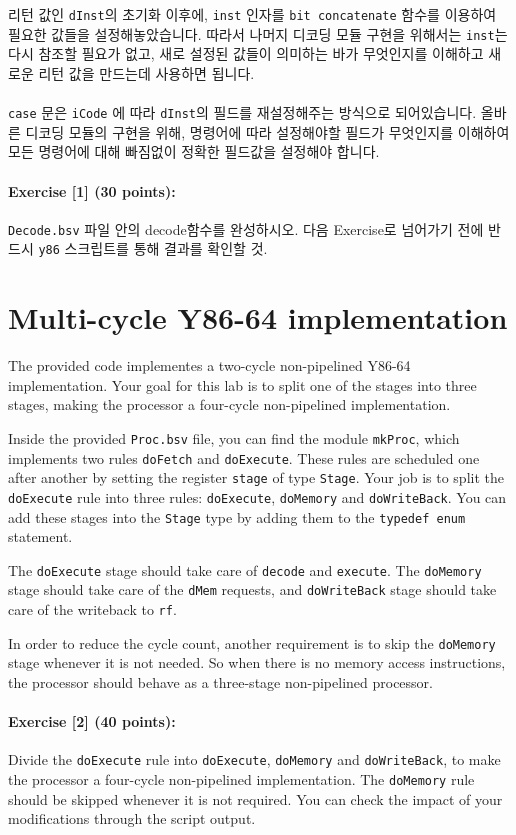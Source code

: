 \documentclass{article}
\begin{document}
  리턴 값인 \texttt{dInst}의 초기화 이후에, \texttt{inst} 인자를 \texttt{bit concatenate}
함수를 이용하여 필요한 값들을 설정해놓았습니다. 따라서 나머지 디코딩 모듈 구현을 위해서는
\texttt{inst}는 다시 참조할 필요가 없고, 새로 설정된 값들이 의미하는 바가 무엇인지를 이해하고 새로운
리턴 값을 만드는데 사용하면 됩니다.
\\\\
  \indent\texttt{case} 문은 \texttt{iCode} 에 따라 \texttt{dInst}의 필드를 재설정해주는 방식으로 되어있습니다.
올바른 디코딩 모듈의 구현을 위해, 명령어에 따라 설정해야할 필드가 무엇인지를 이해하여 모든 명령어에 대해 빠짐없이 정확한 필드값을 설정해야 합니다.

\noindent \paragraph{\bf Exercise [1] (30 points):} \texttt{Decode.bsv} 파일 안의 decode함수를 완성하시오. 다음 Exercise로
넘어가기 전에 반드시 \texttt{y86} 스크립트를 통해 결과를 확인할 것.

\section{Multi-cycle Y86-64 implementation}

The provided code implementes a two-cycle non-pipelined Y86-64
implementation. Your goal for this lab is to split one of the stages
into three stages, making the processor a four-cycle non-pipelined
implementation.

Inside the provided \texttt{Proc.bsv} file, you can find the module
\texttt{mkProc}, which implements two rules \texttt{doFetch} and
\texttt{doExecute}. These rules are scheduled one after another by
setting the register \texttt{stage} of type \texttt{Stage}. Your job
is to split the \texttt{doExecute} rule into three rules:
\texttt{doExecute}, \texttt{doMemory} and \texttt{doWriteBack}. You
can add these stages into the \texttt{Stage} type by adding them to
the \texttt{typedef enum} statement.

The \texttt{doExecute} stage should take care of \texttt{decode} and
\texttt{execute}. The \texttt{doMemory} stage should take care of the
\texttt{dMem} requests, and \texttt{doWriteBack} stage should take
care of the writeback to \texttt{rf}.

In order to reduce the cycle count, another requirement is to skip the
\texttt{doMemory} stage whenever it is not needed. So when there is no
memory access instructions, the processor should behave as a
three-stage non-pipelined processor.

\noindent \paragraph{\bf Exercise [2] (40 points):} Divide the \texttt{doExecute}
rule into \texttt{doExecute}, \texttt{doMemory} and
\texttt{doWriteBack}, to make the processor a four-cycle non-pipelined
implementation. The \texttt{doMemory} rule should be skipped
whenever it is not required. You can check the impact of your
modifications through the script output.
\end{document}
